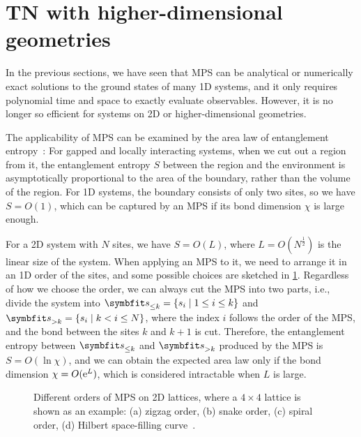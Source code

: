 \section{TN with higher-dimensional geometries}

In the previous sections, we have seen that MPS can be analytical or numerically exact solutions to the ground states of many 1D systems, and it only requires polynomial time and space to exactly evaluate observables. However, it is no longer so efficient for systems on 2D or higher-dimensional geometries.

The applicability of MPS can be examined by the area law of entanglement entropy~\cite{srednicki1993entropy, verstraete2006criticality, hastings2007area, eisert2010colloquium}: For gapped and locally interacting systems, when we cut out a region from it, the entanglement entropy $S$ between the region and the environment is asymptotically proportional to the area of the boundary, rather than the volume of the region. For 1D systems, the boundary consists of only two sites, so we have $S = O(1)$, which can be captured by an MPS if its bond dimension $\chi$ is large enough.

For a 2D system with $N$ sites, we have $S = O(L)$, where $L = O(N^\frac{1}{2})$ is the linear size of the system. When applying an MPS to it, we need to arrange it in an 1D order of the sites, and some possible choices are sketched in \cref{fig:mps-order}. Regardless of how we choose the order, we can always cut the MPS into two parts, i.e., divide the system into $\vs_{\le k} = \{s_i \mid 1 \le i \le k\}$ and $\vs_{> k} = \{s_i \mid k < i \le N\}$, where the index $i$ follows the order of the MPS, and the bond between the sites $k$ and $k + 1$ is cut. Therefore, the entanglement entropy between $\vs_{\le k}$ and $\vs_{> k}$ produced by the MPS is $S = O(\ln \chi)$, and we can obtain the expected area law only if the bond dimension $\chi = O(\mathrm{e}^L)$, which is considered intractable when $L$ is large.

\begin{figure}[htb]
\centering
\hspace*{\fill}
\hspace*{\fill}
\hspace*{\fill}
\hspace*{\fill}
\hspace*{\fill}
\caption[Orders of MPS on 2D lattice]{
Different orders of MPS on 2D lattices, where a $4 \times 4$ lattice is shown as an example: (a) zigzag order, (b) snake order, (c) spiral order, (d) Hilbert space-filling curve~\cite{hilbert1891uber}.
}
\label{fig:mps-order}
\end{figure}

